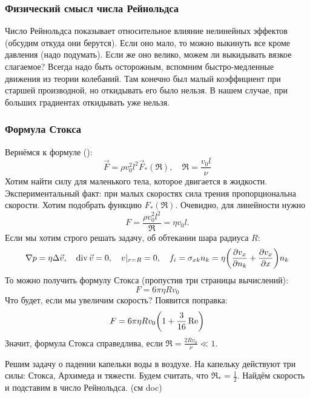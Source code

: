 \subsubsection{Физический смысл числа Рейнольдса}

Число Рейнольдса показывает относительное влияние нелинейных эффектов (обсудим откуда они берутся). 
Если оно мало, то можно выкинуть все кроме давления (надо подумать).
Если же оно велико, можем ли выкидывать вязкое слагаемое? 
Всегда надо быть осторожным, вспомним быстро-медленные движения из теории колебаний.
Там конечно был малый коэффициент при старшей производной, но откидывать его было нельзя. 
В нашем случае, при больших градиентах откидывать уже нельзя.

\subsubsection{Формула Стокса}
Вернёмся к формуле ():
\begin{equation}
     \vec{F} = \rho v_0^2 l^2 \vec{F}_* (\Re), \quad \Re=\frac{v_0 l}{\nu}
\end{equation}
Хотим найти силу для маленького тела, которое двигается в жидкости.
Экспериментальный факт: при малых скоростях сила трения пропорциональна скорости. Хотим подобрать функцию $F_*(\Re)$. Очевидно, для линейности нужно
\begin{equation}
    F=\frac{\rho v_0^2 l^2}{\Re}=\eta v_0 l.
\end{equation}
Если мы хотим строго решать задачу, об обтекании шара радиуса $R$:
\begin{equation}
    \nabla p = \eta \Delta \vec{v}, \quad
    \operatorname{div} \vec{v} = 0, \quad v|_{r=R}=0, \quad
    f_i=\sigma_{xk} n_k = \eta \qty(\pdv{v_x}{n_k}+\pdv{v_x}{x})n_k
\end{equation}
То можно получить формулу Стокса (пропустив три страницы вычислений):
\begin{equation}
    F=6\pi \eta R v_0
\end{equation}
Что будет, если мы увеличим скорость? Появится поправка:
\begin{equation}
    F=6\pi \eta R v_0 \qty(1+\frac{3}{16}\Re)
\end{equation}
Значит, формула Стокса справедлива, если $\Re=\frac{2Rv_0}{\nu} \ll 1$.

Решим задачу о падении капельки воды в воздухе. На капельку действуют три силы: Стокса, Архимеда и тяжести. Будем считать, что $\Re_*=\frac{1}{2}$.
Найдём скорость и подставим в число Рейнольдса. (см doc)

